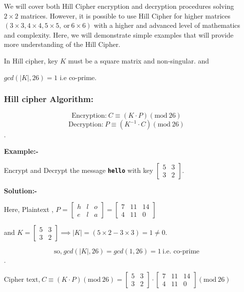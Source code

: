 \documentclass[a4paper,12pt]{article}
\begin{document}
   We will cover both Hill Cipher encryption and decryption procedures solving $2 \times 2$ matrices. However, it is possible to use Hill Cipher for higher matrices $(3\times 3, 4\times 4, 5 \times 5,\  \mbox{or}\  6 \times 6)$ with a higher and advanced level of mathematics and complexity. Here, we will demonstrate simple examples that will provide more understanding of the Hill Cipher.
   \vspace*{1cm}

   In Hill cipher, key $K$ must be  a square matrix and non-singular. and

   $gcd(|K|,26) = 1$ i.e co-prime.

   \subsubsection*{Hill cipher Algorithm:}

   $$\mbox{Encryption:}\ C \equiv (K\cdot P)(\mbox{mod}\ 26)$$
   $$\mbox{Decryption:}\ P \equiv (K^{-1}\cdot C)(\mbox{mod}\ 26)$$.

   {\bf Example:-}

   Encrypt and Decrypt the message {\bf\texttt{hello}} with key $\begin{bmatrix}
    5 & 3\\ 
    3 & 2
    \end{bmatrix}$.  

    {\bf Solution:-}

    Here, Plaintext , $P$ = $\begin{bmatrix}
        h & l & o \\
        e & l & a  
    \end{bmatrix} = \begin{bmatrix}
        7 & 11 & 14 \\
        4 & 11 & 0  
    \end{bmatrix}$

    and $K = \begin{bmatrix}
        5 & 3\\ 
        3 & 2
        \end{bmatrix} \implies |K|=(5\times 2 - 3\times 3) = 1\neq 0.$
        
        $$\mbox{so,}\ gcd(|K|,26) = gcd(1,26) = 1\ \mbox{i.e. co-prime}$$.
     
        
        $ \mbox{Cipher text,}\  C \equiv (K\cdot P)(\mbox{mod}\ 26)  = 
        \begin{bmatrix}
            5 & 3 \\
            3 & 2
        \end{bmatrix}\cdot 
        \begin{bmatrix}
            7 & 11 & 14 \\
            4 & 11 & 0
        \end{bmatrix}(\mbox{mod}\ 26)$
\end{document}
